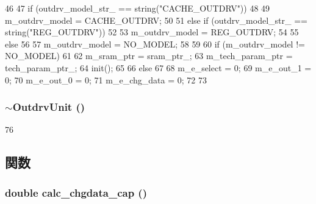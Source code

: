 \begin{DoxyCode}
46 {
47     if (outdrv_model_str_ == string("CACHE_OUTDRV"))
48     {
49         m_outdrv_model = CACHE_OUTDRV;
50     }
51     else if (outdrv_model_str_ == string("REG_OUTDRV"))
52     {
53         m_outdrv_model = REG_OUTDRV;
54     }
55     else
56     {
57         m_outdrv_model = NO_MODEL;
58     }
59 
60     if (m_outdrv_model != NO_MODEL)
61     {
62         m_sram_ptr = sram_ptr_;
63         m_tech_param_ptr = tech_param_ptr_;
64         init();
65     }
66     else
67     {
68         m_e_select = 0;
69         m_e_out_1 = 0;
70         m_e_out_0 = 0;
71         m_e_chg_data = 0;
72     }
73 }
\end{DoxyCode}
\hypertarget{classOutdrvUnit_a15b5d7f2cb338c99c4ea07ab71196221}{
\subsubsection[{$\sim$OutdrvUnit}]{\setlength{\rightskip}{0pt plus 5cm}$\sim${\bf OutdrvUnit} ()}}
\label{classOutdrvUnit_a15b5d7f2cb338c99c4ea07ab71196221}



\begin{DoxyCode}
76 {}
\end{DoxyCode}


\subsection{関数}
\hypertarget{classOutdrvUnit_a8726a71f007fe9b33264bb99f11ed10f}{
\subsubsection[{calc\_\-chgdata\_\-cap}]{\setlength{\rightskip}{0pt plus 5cm}double calc\_\-chgdata\_\-cap ()}}
\label{classOutdrvUnit_a8726a71f007fe9b33264bb99f11ed10f}



